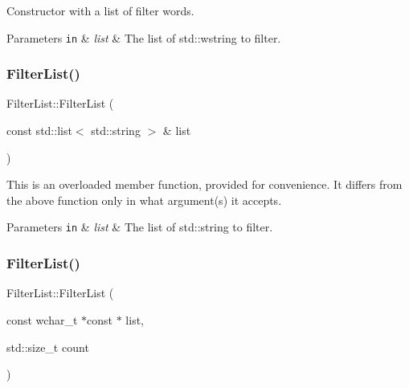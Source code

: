 Constructor with a list of filter words. 


\begin{DoxyParams}[1]{Parameters}
\mbox{\tt in}  & {\em list} & The list of std\+::wstring to filter. \\
\hline
\end{DoxyParams}
\mbox{\label{classlakoo_1_1_filter_list_aa1f55e47a7724168e3b5bce0dfdaa291}} 
\subsubsection{\texorpdfstring{Filter\+List()}{FilterList()}\hspace{0.1cm}{\footnotesize\ttfamily [2/4]}}
{\footnotesize\ttfamily Filter\+List\+::\+Filter\+List (\begin{DoxyParamCaption}\item[{const std\+::list$<$ std\+::string $>$ \&}]{list }\end{DoxyParamCaption})\hspace{0.3cm}{\ttfamily [explicit]}}

This is an overloaded member function, provided for convenience. It differs from the above function only in what argument(s) it accepts. 
\begin{DoxyParams}[1]{Parameters}
\mbox{\tt in}  & {\em list} & The list of std\+::string to filter. \\
\hline
\end{DoxyParams}
\mbox{\label{classlakoo_1_1_filter_list_a18339c4c41745f86651e0083794f8879}} 
\subsubsection{\texorpdfstring{Filter\+List()}{FilterList()}\hspace{0.1cm}{\footnotesize\ttfamily [3/4]}}
{\footnotesize\ttfamily Filter\+List\+::\+Filter\+List (\begin{DoxyParamCaption}\item[{const wchar\+\_\+t $\ast$const $\ast$}]{list,  }\item[{std\+::size\+\_\+t}]{count }\end{DoxyParamCaption})\hspace{0.3cm}{\ttfamily [explicit]}}

